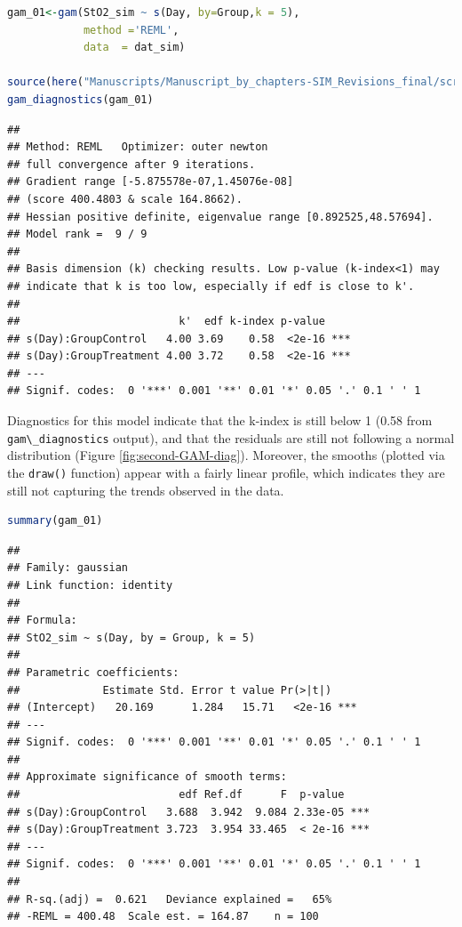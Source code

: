 \documentclass[
]{article}
\newcommand{\passthrough}[1]{#1}
\begin{document}
\begin{lstlisting}[language=R]
gam_01<-gam(StO2_sim ~ s(Day, by=Group,k = 5),
            method ='REML',
            data  = dat_sim)

source(here("Manuscripts/Manuscript_by_chapters-SIM_Revisions_final/scripts","gam_diagnostics.R"))
gam_diagnostics(gam_01)
\end{lstlisting}

\begin{lstlisting}
## 
## Method: REML   Optimizer: outer newton
## full convergence after 9 iterations.
## Gradient range [-5.875578e-07,1.45076e-08]
## (score 400.4803 & scale 164.8662).
## Hessian positive definite, eigenvalue range [0.892525,48.57694].
## Model rank =  9 / 9 
## 
## Basis dimension (k) checking results. Low p-value (k-index<1) may
## indicate that k is too low, especially if edf is close to k'.
## 
##                         k'  edf k-index p-value    
## s(Day):GroupControl   4.00 3.69    0.58  <2e-16 ***
## s(Day):GroupTreatment 4.00 3.72    0.58  <2e-16 ***
## ---
## Signif. codes:  0 '***' 0.001 '**' 0.01 '*' 0.05 '.' 0.1 ' ' 1
\end{lstlisting}

Diagnostics for this model indicate that the k-index is still below 1 (0.58 from \passthrough{\lstinline!gam\_diagnostics!} output), and that the residuals are still not following a normal distribution (Figure \ref{fig:second-GAM-diag}). Moreover, the smooths (plotted via the \passthrough{\lstinline!draw()!} function) appear with a fairly linear profile, which indicates they are still not capturing the trends observed in the data.

\begin{lstlisting}[language=R]
summary(gam_01)
\end{lstlisting}

\begin{lstlisting}
## 
## Family: gaussian 
## Link function: identity 
## 
## Formula:
## StO2_sim ~ s(Day, by = Group, k = 5)
## 
## Parametric coefficients:
##             Estimate Std. Error t value Pr(>|t|)    
## (Intercept)   20.169      1.284   15.71   <2e-16 ***
## ---
## Signif. codes:  0 '***' 0.001 '**' 0.01 '*' 0.05 '.' 0.1 ' ' 1
## 
## Approximate significance of smooth terms:
##                         edf Ref.df      F  p-value    
## s(Day):GroupControl   3.688  3.942  9.084 2.33e-05 ***
## s(Day):GroupTreatment 3.723  3.954 33.465  < 2e-16 ***
## ---
## Signif. codes:  0 '***' 0.001 '**' 0.01 '*' 0.05 '.' 0.1 ' ' 1
## 
## R-sq.(adj) =  0.621   Deviance explained =   65%
## -REML = 400.48  Scale est. = 164.87    n = 100
\end{lstlisting}
\end{document}
